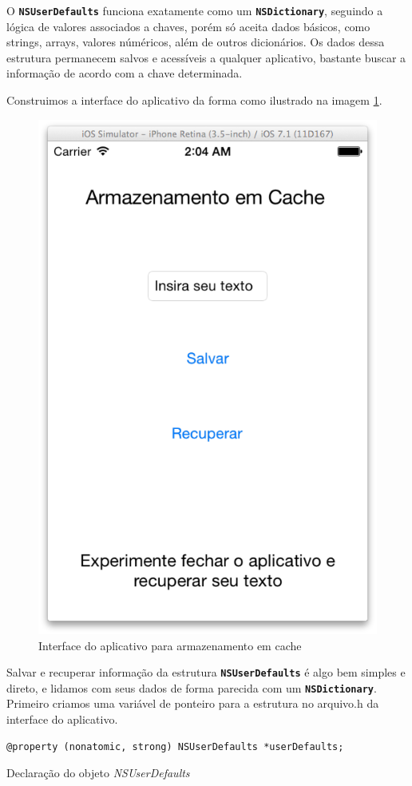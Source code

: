 \documentclass[a4paper,12pt,brazil,doubleside]{book}
\begin{document}
\begin{singlespace}
O \texttt{\textbf{NSUserDefaults}} funciona exatamente como um \texttt{\textbf{NSDictionary}}, seguindo a lógica de valores associados a chaves, porém só aceita dados básicos, como strings, arrays, valores núméricos, além de outros dicionários. Os dados dessa estrutura permanecem salvos e acessíveis a qualquer aplicativo, bastante buscar a informação de acordo com a chave determinada.

Construimos a interface do aplicativo da forma como ilustrado na imagem \ref{fig:app_interface_cache}.

\begin{figure}[H]
  \centering
  \includegraphics[width=.55\textwidth]{figuras/4/interface_api_cache.png}
  \caption{Interface do aplicativo para armazenamento em cache}
  \label{fig:app_interface_cache}
\end{figure}

Salvar e recuperar informação da estrutura \texttt{\textbf{NSUserDefaults}} é algo bem simples e direto, e lidamos com seus dados de forma parecida com um \texttt{\textbf{NSDictionary}}. Primeiro criamos uma variável de ponteiro para a estrutura no arquivo.h da interface do aplicativo.

\begin{listing}[H]
\begin{verbatim}
@property (nonatomic, strong) NSUserDefaults *userDefaults;
\end{verbatim}
\caption{Declaração do objeto \emph{NSUserDefaults}}
\end{listing}


\end{singlespace}
\end{document}
